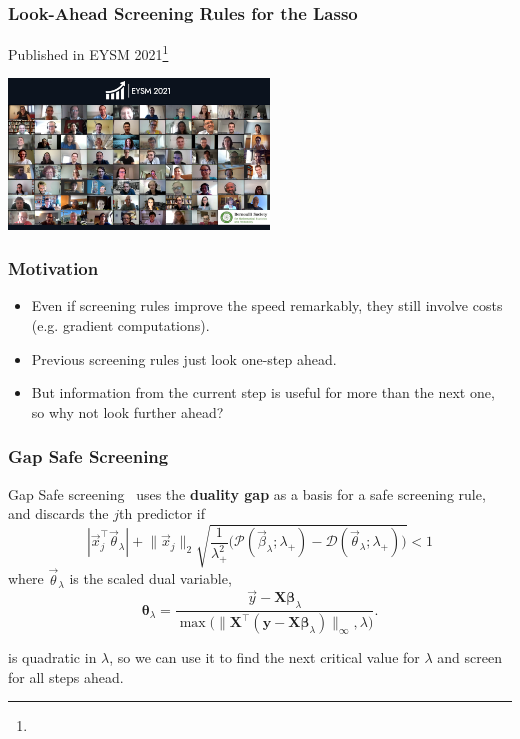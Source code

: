 \documentclass[10pt]{beamer}
\begin{document}
\begin{frame}[c]
  \frametitle{Look-Ahead Screening Rules for the Lasso}
  Published in EYSM 2021\footnote{}

  \bigskip

  \begin{center}
    \includegraphics[height=4cm]{figures/eysm.png}
  \end{center}

\end{frame}

\begin{frame}[c]
  \frametitle{Motivation}
  \begin{itemize}[<+->]
    \item Even if screening rules improve the speed remarkably, they still involve costs (e.g.
          gradient computations).
    \item Previous screening rules just look one-step ahead.
    \item But information from the current step is useful for more than the next one, so why not look
          further ahead?
  \end{itemize}
\end{frame}

\begin{frame}[c]
  \frametitle{Gap Safe Screening}

  Gap Safe screening~\parencite{fercoq2015} uses the \textbf{duality gap} as a basis for a
  safe screening rule, and discards the \(j\)th predictor if
  \begin{equation}
    \label{eq:gap-safe}
    |\vec{x}_j^\intercal \vec{\theta}_\lambda| + \lVert \vec{x}_j\rVert_2
    \sqrt{
      \frac{1}{\lambda_+^2}
      \big(\mathcal{P}(\vec{\beta}_\lambda; \lambda_+) -
      \mathcal{D}(\vec{\theta}_\lambda; \lambda_+)\big)
    }
    < 1
  \end{equation}\pause
  where \(\vec{\theta}_\lambda\) is the \alert{scaled} dual variable,
  \[
    \bm{\theta}_\lambda = \frac{\vec{y} - \bm{X\beta}_\lambda}{
      \max\big( \lVert \bm{X}^\intercal(\bm{y} - \bm{X\beta}_\lambda)\rVert_\infty, \lambda\big)}.
  \]
  \pause\medskip

   is \alert{quadratic} in \(\lambda\),
  so we can use it to find the next critical value for \(\lambda\) and
  screen for \alert{all} steps ahead.

\end{frame}
\end{document}
